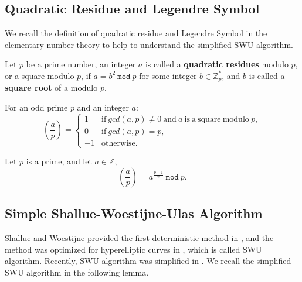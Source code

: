 \subsection{Quadratic Residue and Legendre Symbol}
We recall the definition of quadratic residue and Legendre Symbol in the
elementary number theory to help to understand the simplified-SWU
algorithm.
\begin{defn}
Let $p$ be a prime number, an integer $a$ is called a 
\textbf{quadratic residues} modulo $p$, or a square modulo $p$, if 
$a = b^2\ \texttt{mod}\ p$ for some integer $b \in \mathbb{Z}_p^*$, and $b$
is called a \textbf{square root} of a modulo $p$.
\end{defn}
\begin{defn}
For an odd prime $p$ and an integer $a$:
\begin{equation}
\left(\frac{a}{p}\right) = \left\{
\begin{array}{rl}
1 & \mathrm{if\ } gcd(a, p) \neq 0 \mathrm{\ and\ } a
\mathrm{\ is\ a\ square\ modulo\ } p,\\
0 & \mathrm{if\ } gcd(a, p) = p,\\
-1 & \mathrm{otherwise}.
\end{array}
\right.
\end{equation}
\end{defn}

\begin{theorem}
\label{square}
Let $p$ is a prime, and let $a\in \mathbb{Z}$,
\begin{equation}
\left(\frac{a}{p}\right) = a^{\frac{p-1}{2}} \mathtt{\ mod\ } p.
\end{equation}
\end{theorem}

\subsection{Simple Shallue-Woestijne-Ulas Algorithm}
Shallue and Woestijne provided the first deterministic method in \cite{SW06}, and
the method was optimized for hyper\-elliptic curves in \cite{Ulas07}, which is
called SWU algorithm. Recently, SWU algorithm was simplified in
\cite{brier2010efficient}. We recall the simplified SWU algorithm in the
following lemma.

